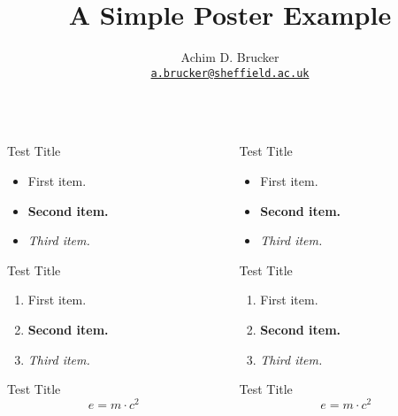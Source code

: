 \documentclass[orientation=landscape,size=a1,scale=1.2]{tuos-poster}
\title{A Simple Poster Example}
\subtitle{}
\institute[The University of Sheffield]
{Department of Computer Science, The University of Sheffield, Sheffield, UK}
\author[A.D. Brucker]{Achim D. Brucker\\[0.2em]
    \texttt{\small\href{mailto:"Achim D. Brucker"
    <a.brucker@sheffield.ac.uk>}{a.brucker@sheffield.ac.uk}}
}
\begin{document}
\begin{frame}[t]
  \begin{columns}[t]
    \begin{column}{.31\textwidth}
      \begin{block}{Test Title}
         \begin{itemize}
           \item \alert{First item.}
           \item \textbf{Second item.}
           \item \emph{Third item.}
         \end{itemize}
      \end{block}
      \begin{block}{Test Title}
         \begin{enumerate}
           \item \alert{First item.}
           \item \textbf{Second item.}
           \item \emph{Third item.}
         \end{enumerate}
      \end{block}
      \begin{block}{Test Title}
        \[ e = m \cdot c^2 \]
      \end{block}
    \end{column}
%
    \begin{column}{.31\textwidth}
      \begin{alertblock}{Test Title}
         \begin{itemize}
           \item \alert{First item.}
           \item \textbf{Second item.}
           \item \emph{Third item.}
         \end{itemize}
      \end{alertblock}
      \begin{alertblock}{Test Title}
         \begin{enumerate}
           \item \alert{First item.}
           \item \textbf{Second item.}
           \item \emph{Third item.}
         \end{enumerate}
      \end{alertblock}
      \begin{alertblock}{Test Title}
        \[ e = m \cdot c^2 \]
      \end{alertblock}

\end{column}
\end{columns}
\end{frame}
\end{document}
